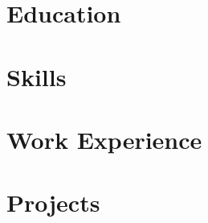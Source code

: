 \documentclass[letter,10pt]{article}
\begin{document}


\section{Education}


\section{Skills}


\section{Work Experience}


\section{Projects}






\end{document}
